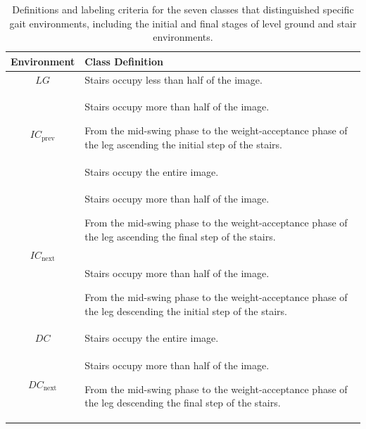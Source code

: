 \documentclass[actuators,article,accept,pdftex,moreauthors]{Definitions/mdpi}
\begin{document}
\begin{table}[H] 
\caption{{Definitions and labeling} 
 criteria for the seven classes that distinguished specific gait environments, including the initial and final stages of level ground and stair environments.\label{tab5}}
\begin{tabularx}{\textwidth}{cX}%
\toprule
\textbf{Environment}&\textbf{Class Definition}\\
\midrule
$LG$		                   & Stairs occupy less than half of the image.			\\
\hline
\multirow[m]{2}{*}{$IC_{\text{prev}}$}	& Stairs occupy more than half of the image. \par From the mid-swing phase to the weight-acceptance phase of the leg ascending the initial step of the stairs.\\
\hline
$IC$	& Stairs occupy the entire image.			\\
\hline
\multirow[m]{2}{*}{$IC_{\text{next}}$}		 &Stairs occupy more than half of the image. \par From the mid-swing phase to the weight-acceptance phase of the leg ascending the final step of the stairs.\\
\hline
\multirow[m]{2}{*}{$DC_{\text{prev}}$}     & Stairs occupy more than half of the image. \par From the mid-swing phase to the weight-acceptance phase of the leg descending the initial step of the stairs.\\
\hline
$DC$	& Stairs occupy the entire image.\\
\hline
\multirow[m]{2}{*}{$DC_{\text{next}}$}	    & Stairs occupy more than half of the image. \par From the mid-swing phase to the weight-acceptance phase of the leg descending the final step of the stairs.\\
\bottomrule
\end{tabularx}
\end{table}
\end{document}
